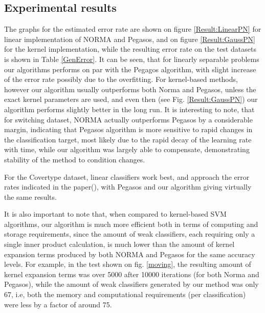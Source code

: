 \subsection{Experimental results}
The graphs for the estimated error rate are shown on figure \ref{Result:LinearPN} for linear implementation of NORMA and Pegasos, and on figure \ref{Result:GaussPN} for the kernel implementation, while the resulting error rate on the test datasets is shown in Table \ref{GenError}.
It can be  seen, that for linearly separable problems our algorithms performs on par with the Pegagos algorithm, with slight increase of the error rate possibly due to the overfitting. For kernel-based methods, however our algorithm usually outperforms both Norma and Pegasos, unless the exact kernel parameters are used, and even then (see Fig. \ref{Result:GaussPN}) our algorithm performs slightly better in the long run. It is interesting to note, that for switching dataset, NORMA actually outperforms Pegasos by a considerable margin, indicating that Pegasos algorithm is more sensitive to rapid changes in the classification target, most likely due to the rapid decay of the learning rate with time, while our algorithm was largely able to compensate, demonstrating stability of the method to condition changes. 

For the Covertype dataset, linear classifiers work best, and approach the error rates indicated in the paper(\cite{Forest}), with Pegasos and our algorithm giving virtually the same results. 

It is also important to note that, when compared to kernel-based SVM algorithms, our algorithm is much more efficient both in terms of computing and storage requirements, since the amount of weak classifiers, each requiring only a single inner product calculation, is much lower than the amount of kernel expansion terms produced by both NORMA and Pegasos for the same accuracy levels. For example, in the test shown on fig. \ref{moving},  the resulting amount of kernel expansion terms was over 5000 after 10000 iterations (for both Norma and Pegasos), while the amount of weak classifiers generated by our method was only 67, i.e, both the memory and computational requirements (per classification) were less by a factor of around 75. 

